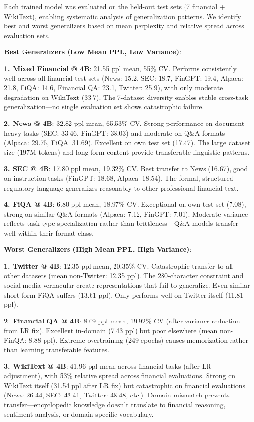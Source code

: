 Each trained model was evaluated on the held-out test sets (7 financial + WikiText), enabling systematic analysis of generalization patterns. We identify best and worst generalizers based on mean perplexity and relative spread across evaluation sets.

\textbf{Best Generalizers (Low Mean PPL, Low Variance)}:

\textbf{1. Mixed Financial @ 4B}: 21.55 ppl mean, 55\% CV. Performs consistently well across all financial test sets (News: 15.2, SEC: 18.7, FinGPT: 19.4, Alpaca: 21.8, FiQA: 14.6, Financial QA: 23.1, Twitter: 25.9), with only moderate degradation on WikiText (33.7). The 7-dataset diversity enables stable cross-task generalization—no single evaluation set shows catastrophic failure.

\textbf{2. News @ 4B}: 32.82 ppl mean, 65.53\% CV. Strong performance on document-heavy tasks (SEC: 33.46, FinGPT: 38.03) and moderate on Q\&A formats (Alpaca: 29.75, FiQA: 31.69). Excellent on own test set (17.47). The large dataset size (197M tokens) and long-form content provide transferable linguistic patterns.

\textbf{3. SEC @ 4B}: 17.80 ppl mean, 19.32\% CV. Best transfer to News (16.67), good on instruction tasks (FinGPT: 18.68, Alpaca: 18.54). The formal, structured regulatory language generalizes reasonably to other professional financial text.

\textbf{4. FiQA @ 4B}: 6.80 ppl mean, 18.97\% CV. Exceptional on own test set (7.08), strong on similar Q\&A formats (Alpaca: 7.12, FinGPT: 7.01). Moderate variance reflects task-type specialization rather than brittleness—Q\&A models transfer well within their format class.

\textbf{Worst Generalizers (High Mean PPL, High Variance)}:

\textbf{1. Twitter @ 4B}: 12.35 ppl mean, 20.35\% CV. Catastrophic transfer to all other datasets (mean non-Twitter: 12.35 ppl). The 280-character constraint and social media vernacular create representations that fail to generalize. Even similar short-form FiQA suffers (13.61 ppl). Only performs well on Twitter itself (11.81 ppl).

\textbf{2. Financial QA @ 4B}: 8.09 ppl mean, 19.92\% CV (after variance reduction from LR fix). Excellent in-domain (7.43 ppl) but poor elsewhere (mean non-FinQA: 8.88 ppl). Extreme overtraining (249 epochs) causes memorization rather than learning transferable features.

\textbf{3. WikiText @ 4B}: 41.96 ppl mean across financial tasks (after LR adjustment), with \~53\% relative spread across financial evaluations. Strong on WikiText itself (31.54 ppl after LR fix) but catastrophic on financial evaluations (News: 26.44, SEC: 42.41, Twitter: 48.48, etc.). Domain mismatch prevents transfer—encyclopedic knowledge doesn't translate to financial reasoning, sentiment analysis, or domain-specific vocabulary.

